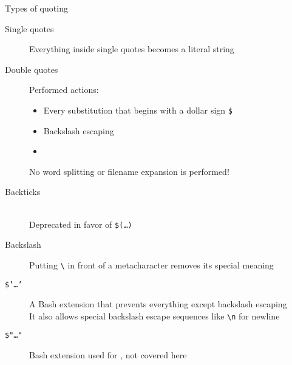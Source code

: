 
\begin{frame}[label={Quotes}]{Types of quoting}
    \vspace{-4mm}
    \begin{description}
        \item[Single quotes] Everything inside single quotes becomes a literal string\\[-0.3em]
        \item[Double quotes] Performed actions:
                             \begin{itemize}
                                 \item Every substitution that begins with a dollar sign \texttt{\$}
                                 \item Backslash escaping
                                 \item {}
                             \end{itemize}
                             \alert{No word splitting or filename expansion is performed!}
        \item[Backticks] \\
                         \alert{Deprecated in favor of \texttt{\$(\ldots)}}
        \item[Backslash] Putting \texttt{\textbackslash} in front of a metacharacter removes its special meaning\\[-0.3em]
        \item[\texttt{\$'\ldots'}] A Bash extension that prevents everything except backslash escaping\\
                                   It also allows special backslash escape sequences like \texttt{\textbackslash{}n} for newline%
        \item[\texttt{\$"\ldots"}] Bash extension used for , not covered here
    \end{description}
\end{frame}
